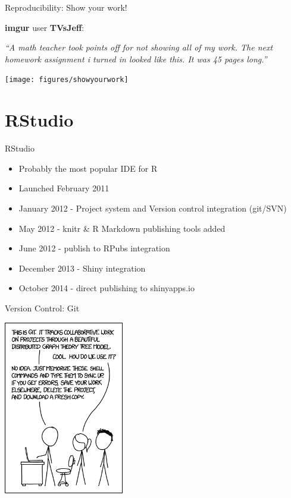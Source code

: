 \documentclass{beamer}
\begin{document}
\begin{frame}{Reproducibility: Show your work!}
    \begin{minipage}{.45\textwidth}
\small{
\vspace{0.5cm}

\textbf{imgur} user \textbf{TVsJeff}: 
\vspace{0.5cm}

\emph{``A math teacher took points off for not showing all of my work. The next homework assignment i turned in looked like this. It was 45 pages long.''}}
    \end{minipage}\hfill
    \begin{minipage}{.5\textwidth}
\texttt{[image: figures/showyourwork]}
    \end{minipage}
  
\end{frame}

\section{RStudio}
\begin{frame}{RStudio}
\begin{itemize}
\item Probably the most popular IDE for R
\item Launched February 2011
\item January 2012 - Project system and Version control integration (git/SVN)
\item May 2012 - knitr \& R Markdown publishing tools added
\item June 2012 - publish to RPubs integration
\item December 2013 - Shiny integration
\item October 2014 - direct publishing to shinyapps.io
\end{itemize}
\end{frame}

\begin{frame}{Version Control: Git}

\includegraphics[height=7.6cm]{figures/git}

\end{frame}
\end{document}
